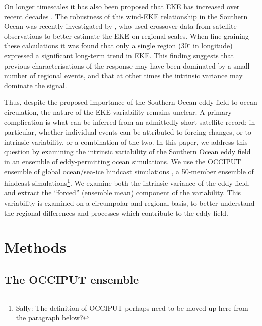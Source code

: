 \documentclass{agujournal2019}
\begin{document}
On longer timescales it has also been proposed that EKE has increased over recent decades \citep{Hogg2015, Martinez-Moreno2019, Martinez-Moreno2021-ncc}.
The robustness of this wind-EKE relationship in the Southern Ocean was recently investigated by \citet{Zhang2021}, who used crossover data from satellite observations \citep[as in][]{Hogg2015} to better estimate the EKE on regional scales.
When fine graining these calculations it was found that only a single region (30$^\circ$ in longitude) expressed a significant long-term trend in EKE.
This finding  suggests that previous characterisations of the response may have been dominated by a small number of regional events, and that at other times the intrinsic variance may dominate the signal.

Thus, despite the proposed importance of the Southern Ocean eddy field to ocean circulation, the nature of the EKE variability remains unclear.
A primary complication is what can be inferred from an admittedly short satellite record; in particular, whether individual events can be attributed to forcing changes, or to intrinsic variability, or a combination of the two.
In this paper, we address this question by examining the intrinsic variability of the Southern Ocean eddy field in an ensemble of eddy-permitting ocean simulations.
We use the OCCIPUT ensemble of global ocean/sea-ice hindcast simulations \citep{Penduff-etal-2014, Leroux2018}, a 50-member ensemble of hindcast simulations\footnote{{\color{blue}Sally: The definition of OCCIPUT perhaps need to be moved up here from the paragraph below?}}.
We examine both the intrinsic variance of the eddy field, and extract the ``forced'' (ensemble mean) component of the variability.
This variability is examined on a circumpolar and regional basis, to better understand the regional differences and processes which contribute to the eddy field.



\section{Methods}

\subsection{The OCCIPUT ensemble}
\end{document}
